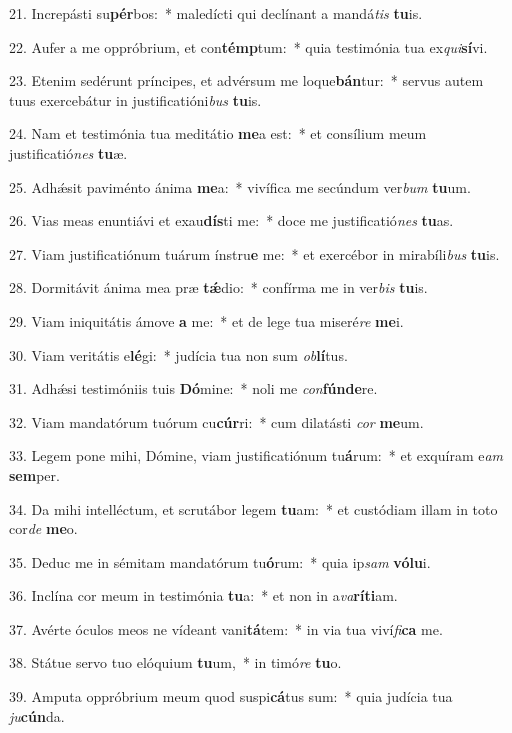 21. Increpásti su\textbf{pér}bos:~*  maledícti qui declínant a mandá\textit{tis} \textbf{tu}is.\

22. Aufer a me oppróbrium, et con\textbf{témp}tum:~*  quia testimónia tua ex\textit{qui}\textbf{sí}vi.\

23. Etenim sedérunt príncipes, et advérsum me loque\textbf{bán}tur:~*  servus autem tuus exercebátur in justificatióni\textit{bus} \textbf{tu}is.\

24. Nam et testimónia tua meditátio \textbf{me}a est:~*  et consílium meum justificatió\textit{nes} \textbf{tu}æ.\

25. Adhǽsit paviménto ánima \textbf{me}a:~*  vivífica me secúndum ver\textit{bum} \textbf{tu}um.\

26. Vias meas enuntiávi et exau\textbf{dís}ti me:~*  doce me justificatió\textit{nes} \textbf{tu}as.\

27. Viam justificatiónum tuárum ínstru\textbf{e} me:~*  et exercébor in mirabíli\textit{bus} \textbf{tu}is.\

28. Dormitávit ánima mea præ \textbf{tǽ}dio:~*  confírma me in ver\textit{bis} \textbf{tu}is.\

29. Viam iniquitátis ámove \textbf{a} me:~*  et de lege tua miseré\textit{re} \textbf{me}i.\

30. Viam veritátis e\textbf{lé}gi:~*  judícia tua non sum \textit{ob}\textbf{lí}tus.\

31. Adhǽsi testimóniis tuis \textbf{Dó}mine:~*  noli me \textit{con}\textbf{fún}\textbf{de}re.\

32. Viam mandatórum tuórum cu\textbf{cúr}ri:~*  cum dilatásti \textit{cor} \textbf{me}um.\

33. Legem pone mihi, Dómine, viam justificatiónum tu\textbf{á}rum:~*  et exquíram e\textit{am} \textbf{sem}per.\

34. Da mihi intelléctum, et scrutábor legem \textbf{tu}am:~*  et custódiam illam in toto cor\textit{de} \textbf{me}o.\

35. Deduc me in sémitam mandatórum tu\textbf{ó}rum:~*  quia ip\textit{sam} \textbf{vó}\textbf{lu}i.\

36. Inclína cor meum in testimónia \textbf{tu}a:~*  et non in a\textit{va}\textbf{rí}\textbf{ti}am.\

37. Avérte óculos meos ne vídeant vani\textbf{tá}tem:~*  in via tua viví\textit{fi}\textbf{ca} me.\

38. Státue servo tuo elóquium \textbf{tu}um,~*  in timó\textit{re} \textbf{tu}o.\

39. Amputa oppróbrium meum quod suspi\textbf{cá}tus sum:~*  quia judícia tua \textit{ju}\textbf{cún}da.\

